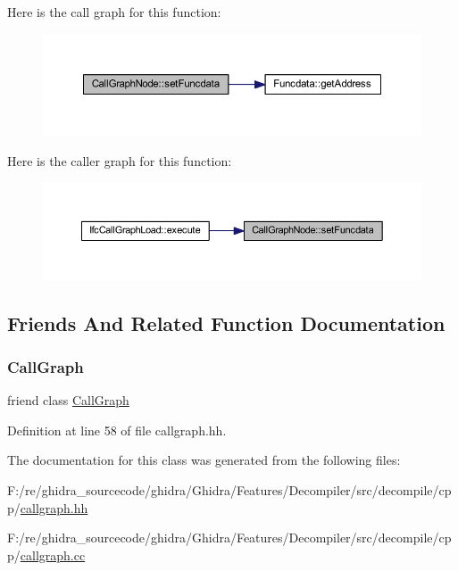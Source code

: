 Here is the call graph for this function\+:
\nopagebreak
\begin{figure}[H]
\begin{center}
\leavevmode
\includegraphics[width=350pt]{class_call_graph_node_adf4b77eb0513240ef97b1e0381758dad_cgraph}
\end{center}
\end{figure}
Here is the caller graph for this function\+:
\nopagebreak
\begin{figure}[H]
\begin{center}
\leavevmode
\includegraphics[width=350pt]{class_call_graph_node_adf4b77eb0513240ef97b1e0381758dad_icgraph}
\end{center}
\end{figure}


\subsection{Friends And Related Function Documentation}
\mbox{\label{class_call_graph_node_a05afb094c2637ded1f1b905b70d198a9}} 
\subsubsection{\texorpdfstring{CallGraph}{CallGraph}}
{\footnotesize\ttfamily friend class \mbox{\hyperlink{class_call_graph}{Call\+Graph}}\hspace{0.3cm}{\ttfamily [friend]}}



Definition at line 58 of file callgraph.\+hh.



The documentation for this class was generated from the following files\+:\begin{DoxyCompactItemize}
\item 
F\+:/re/ghidra\+\_\+sourcecode/ghidra/\+Ghidra/\+Features/\+Decompiler/src/decompile/cpp/\mbox{\hyperlink{callgraph_8hh}{callgraph.\+hh}}\item 
F\+:/re/ghidra\+\_\+sourcecode/ghidra/\+Ghidra/\+Features/\+Decompiler/src/decompile/cpp/\mbox{\hyperlink{callgraph_8cc}{callgraph.\+cc}}\end{DoxyCompactItemize}
